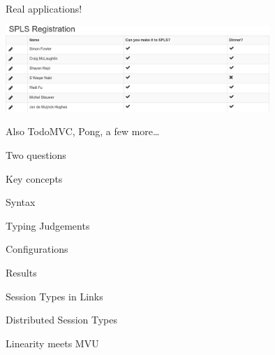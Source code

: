 \documentclass[11.5pt, aspectratio=169]{beamer}
\begin{document}
\begin{frame}{Real applications!}

  \begin{center}
    \includegraphics[width=0.75\textwidth]{images/spls-reg.png}
  \end{center}

  \begin{itemize}
    \itemR Also TodoMVC, Pong, a few more\ldots
  \end{itemize}
\end{frame}


\begin{frame}{Two questions}
\end{frame}


\begin{frame}{Key concepts}
\end{frame}

\begin{frame}{Syntax}
\end{frame}

\begin{frame}{Typing Judgements}
\end{frame}

\begin{frame}{Configurations}
\end{frame}

\begin{frame}{Results}
\end{frame}


\begin{frame}{Session Types in Links}
\end{frame}

\begin{frame}{Distributed Session Types}
\end{frame}

\begin{frame}{Linearity meets MVU}
\end{frame}
\end{document}
